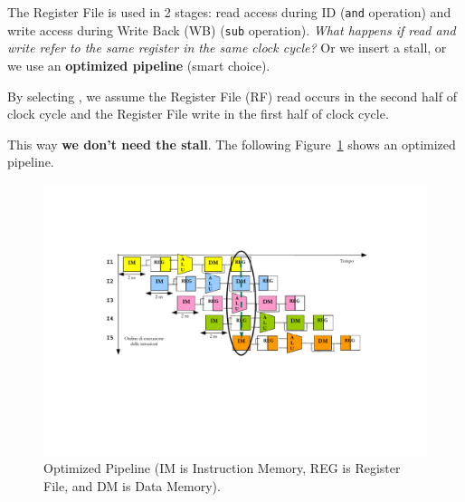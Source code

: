 \noindent
The Register File is used in 2 stages: read access during ID (\texttt{and} operation) and write access during Write Back (WB) (\texttt{sub} operation). \emph{What happens if read and write refer to the same register in the same clock cycle?} Or we insert a stall, or we use an \textbf{optimized pipeline} (smart choice).

\begin{definitionbox}
    By selecting , we assume the Register File (RF) read occurs in the second half of clock cycle and the Register File write in the first half of clock cycle.
\end{definitionbox}

\noindent
This way \textbf{we don't need the stall}. The following Figure~\ref{fig: Optimized Pipeline} shows an optimized pipeline.

\newpage

\begin{figure}[!htp]
    \centering
    \includegraphics[width=\textwidth]{img/optimized-pipeline-1.pdf}
    \caption{Optimized Pipeline (IM is Instruction Memory, REG is Register File, and DM is Data Memory).\cite{pipelining-slides}}
    \label{fig: Optimized Pipeline}
\end{figure}

